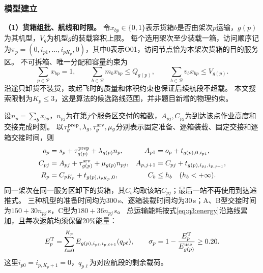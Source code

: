 \subsubsection{模型建立}
\label{sec:q3:formulation}

\textbf{（1）货箱组批、航线和时限。}
令$x_{bp}\in\{0,1\}$表示货箱$b$是否由架次$p$运输，$g(p)$为其机型，$V_g$为机型$g$的装载容积上限。
每个选用架次至少装载一箱，访问顺序记为$\pi_p=(0,i_{p1},\ldots,i_{pK_p},0)$，其中0表示O01，访问节点恰为本架次货箱的目的服务区。
不可拆箱、唯一分配和容量约束为
\begin{equation}
  \sum_{p\in\mathcal P}x_{bp}=1,\qquad
  \sum_{b\in\mathcal B}m_bx_{bp}\le Q_{g(p)},\qquad
  \sum_{b\in\mathcal B}v_bx_{bp}\le V_{g(p)}.
  \label{eq:q3:packing}
\end{equation}
沿途只卸货不装货，故起飞时的质量和体积约束也保证后续航段不超载。
本文搜索限制为$K_p\le3$，这是算法的候选路线范围，并非题目新增的物理约束。

设$n_p=\sum_bx_{bp}$，$n_{pj}$为在第$j$个服务区交付的箱数，$A_{pj},C_{pj}$为到达该点作业高度和交接完成时刻。
以$\tau_g^{\rm prep},\lambda_g,\tau_g^{\rm srv},\mu_g$分别表示固定准备、逐箱装载、固定交接和逐箱交接时间，则
\begin{align}
  o_p&=s_p+\tau_{g(p)}^{\rm prep}+\lambda_{g(p)}n_p,
  & A_{p1}&=o_p+t_{g(p),0,i_{p1}},\notag\\
  C_{pj}&=A_{pj}+\tau_{g(p)}^{\rm srv}+\mu_{g(p)}n_{pj},
  & A_{p,j+1}&=C_{pj}+t_{g(p),i_{pj},i_{p,j+1}},\notag\\
  R_p&=C_{pK_p}+t_{g(p),i_{pK_p},0},
  & C_b&\le h_b\quad(h_b<+\infty).
  \label{eq:q3:transport-time}
\end{align}
同一架次在同一服务区卸下的货箱，其$C_b$均取该站$C_{pj}$；最后一站不再使用到达递推式。
三种机型的准备时间均为300\,s、逐箱装载时间均为30\,s；A、B型交接时间为$150+30n_{pj}$\,s，C型为$180+36n_{pj}$\,s。
总运输能耗按式\eqref{eq:q3:energy}沿路线累加，且每次返航均须保留20\%能量：
\begin{equation}
  E_p^{\rm T}=\sum_{\ell=0}^{K_p}
     E_{g(p),i_{p\ell},i_{p,\ell+1}}(q_{p\ell}),\qquad
  \sigma_p=1-\frac{E_p^{\rm T}}{E_{g(p)}^{\rm use}}\ge0.20.
  \label{eq:q3:reserve}
\end{equation}
这里$i_{p0}=i_{p,K_p+1}=0$，$q_{p\ell}$为对应航段的剩余载荷。


